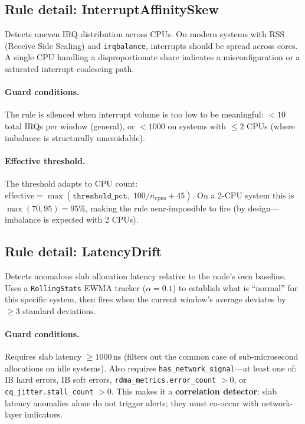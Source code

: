 \documentclass[11pt]{article}
\begin{document}
\subsection{Rule detail: InterruptAffinitySkew}

Detects uneven IRQ distribution across CPUs. On modern systems with RSS
(Receive Side Scaling) and \texttt{irqbalance}, interrupts should be
spread across cores. A single CPU handling a disproportionate share
indicates a misconfiguration or a saturated interrupt coalescing path.

\paragraph{Guard conditions.}
The rule is silenced when interrupt volume is too low to be meaningful:
$<10$ total IRQs per window (general), or $<1000$ on systems with $\leq 2$
CPUs (where imbalance is structurally unavoidable).

\paragraph{Effective threshold.}
The threshold adapts to CPU count:
$\text{effective} = \max(\texttt{threshold\_pct},\; 100/n_\text{cpus} + 45)$.
On a 2-CPU system this is $\max(70, 95) = 95$\%, making the rule
near-impossible to fire (by design---imbalance is expected with 2 CPUs).

\subsection{Rule detail: LatencyDrift}

Detects anomalous slab allocation latency relative to the node's own
baseline. Uses a \texttt{RollingStats} EWMA tracker ($\alpha = 0.1$) to
establish what is ``normal'' for this specific system, then fires when the
current window's average deviates by $\geq 3$ standard deviations.

\paragraph{Guard conditions.}
Requires slab latency $\geq 1000$\,ns (filters out the common case of
sub-microsecond allocations on idle systems). Also requires
\texttt{has\_network\_signal}---at least one of: IB hard errors, IB soft
errors, \texttt{rdma\_metrics.error\_count} $>0$, or
\texttt{cq\_jitter.stall\_count} $>0$. This makes it a
\textbf{correlation detector}: slab latency anomalies alone do not trigger
alerts; they must co-occur with network-layer indicators.
\end{document}
